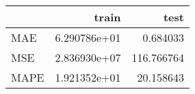 \begin{tabular}{lrr}
\toprule
{} &         train &        test \\
\midrule
MAE  &  6.290786e+01 &    0.684033 \\
MSE  &  2.836930e+07 &  116.766764 \\
MAPE &  1.921352e+01 &   20.158643 \\
\bottomrule
\end{tabular}
